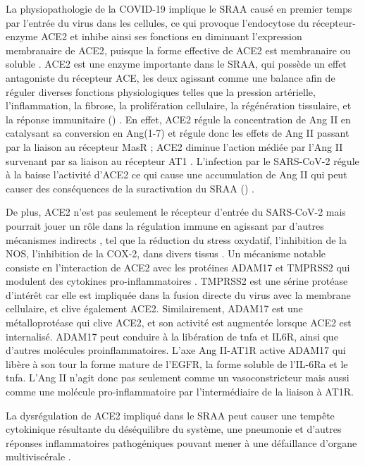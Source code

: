 \documentclass[
  a4paper,
  DIV=11,
  numbers=noendperiod,
  listof=totoc]{scrreprt}
\begin{document}
La physiopathologie de la COVID-19 implique le \ac{SRAA} causé en
premier temps par l'entrée du virus dans les cellules, ce qui provoque
l'endocytose du récepteur-enzyme \ac{ACE2} et inhibe ainsi ses fonctions
en diminuant l'expression membranaire de \ac{ACE2}, puisque la forme
effective de \ac{ACE2} est membranaire ou soluble
\autocite{Donoghue.2000}. \ac{ACE2} est une enzyme importante dans le
\ac{SRAA}, qui possède un effet antagoniste du récepteur \ac{ACE}, les
deux agissant comme une balance afin de réguler diverses fonctions
physiologiques telles que la pression artérielle, l'inflammation, la
fibrose, la prolifération cellulaire, la régénération tissulaire, et la
réponse immunitaire ()
\autocite{Brojakowska.2020}. En effet, \ac{ACE2} régule la concentration
de \ac{Ang II} en catalysant sa conversion en \ac{Ang(1-7)} et régule
donc les effets de \ac{Ang II} passant par la liaison au récepteur
\ac{MasR} ; ACE2 diminue l'action médiée par l'\ac{Ang II} survenant par
sa liaison au récepteur AT1 \autocite{Gotelli.2022}. L'infection par le
SARS-CoV-2 régule à la baisse l'activité d'\ac{ACE2} ce qui cause une
accumulation de \ac{Ang II} qui peut causer des conséquences de la
suractivation du SRAA () \autocite{Mahdavi.2020}.

De plus, \ac{ACE2} n'est pas seulement le récepteur d'entrée du
SARS-CoV-2 mais pourrait jouer un rôle dans la régulation immune en
agissant par d'autres mécanismes indirects \autocite{Jiang.2014}, tel
que la réduction du stress oxydatif, l'inhibition de la \ac{NOS},
l'inhibition de la \ac{COX-2}, dans divers tissus \autocite{Jiang.2014}.
Un mécanisme notable consiste en l'interaction de \ac{ACE2} avec les
protéines \ac{ADAM17} et \ac{TMPRSS2} qui modulent des cytokines
pro-inflammatoires \autocite{Zipeto.2020}. \ac{TMPRSS2} est une sérine
protéase d'intérêt car elle est impliquée dans la fusion directe du
virus avec la membrane cellulaire, et clive également \ac{ACE2}.
Similairement, \ac{ADAM17} est une métalloprotéase qui clive \ac{ACE2},
et son activité est augmentée lorsque \ac{ACE2} est internalisé.
\ac{ADAM17} peut conduire à la libération de \ac{tnfa} et IL6R, ainsi
que d'autres molécules proinflammatoires. L'axe Ang II-AT1R active
\ac{ADAM17} qui libère à son tour la forme mature de l'\ac{EGFR}, la
forme soluble de l'IL-6Ra et le \ac{tnfa}. L'\ac{Ang II} n'agit donc pas
seulement comme un vasoconstricteur mais aussi comme une molécule
pro-inflammatoire par l'intermédiaire de la liaison à \ac{AT1R}.

La dysrégulation de \ac{ACE2} impliqué dans le \ac{SRAA} peut causer une
tempête cytokinique résultante du déséquilibre du système, une pneumonie
et d'autres réponses inflammatoires pathogéniques pouvant mener à une
défaillance d'organe multiviscérale \autocite{Argano.2023}.
\end{document}
